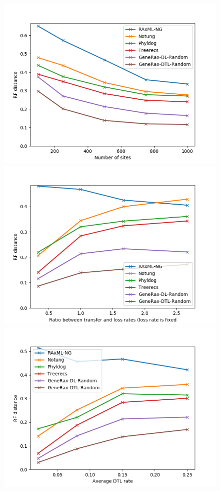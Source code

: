 \documentclass[12pt,a4paper]{article}
\begin{document}
\begin{figure}
\includegraphics[scale=0.5]{sites_dtl.png}
\includegraphics[scale=0.5]{transfers_dtl.png}
\includegraphics[scale=0.5]{dtl_rates_multiplier_dtl.png}
\end{figure}
\end{document}

